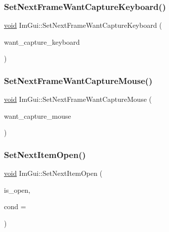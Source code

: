 \mbox{\label{namespaceImGui_ac1b2639c15a22180748c792aff2a7e60}} 
\subsubsection{\texorpdfstring{Set\+Next\+Frame\+Want\+Capture\+Keyboard()}{SetNextFrameWantCaptureKeyboard()}}
{\footnotesize\ttfamily \hyperlink{imgui__impl__opengl3__loader_8h_ac668e7cffd9e2e9cfee428b9b2f34fa7}{void} Im\+Gui\+::\+Set\+Next\+Frame\+Want\+Capture\+Keyboard (\begin{DoxyParamCaption}\item[{bool}]{want\+\_\+capture\+\_\+keyboard }\end{DoxyParamCaption})}

\mbox{\label{namespaceImGui_affc347668060a3dfbfae50247eaac7d2}} 
\subsubsection{\texorpdfstring{Set\+Next\+Frame\+Want\+Capture\+Mouse()}{SetNextFrameWantCaptureMouse()}}
{\footnotesize\ttfamily \hyperlink{imgui__impl__opengl3__loader_8h_ac668e7cffd9e2e9cfee428b9b2f34fa7}{void} Im\+Gui\+::\+Set\+Next\+Frame\+Want\+Capture\+Mouse (\begin{DoxyParamCaption}\item[{bool}]{want\+\_\+capture\+\_\+mouse }\end{DoxyParamCaption})}

\mbox{\label{namespaceImGui_a4a90137256a3ce852e726cb65d55b627}} 
\subsubsection{\texorpdfstring{Set\+Next\+Item\+Open()}{SetNextItemOpen()}}
{\footnotesize\ttfamily \hyperlink{imgui__impl__opengl3__loader_8h_ac668e7cffd9e2e9cfee428b9b2f34fa7}{void} Im\+Gui\+::\+Set\+Next\+Item\+Open (\begin{DoxyParamCaption}\item[{bool}]{is\+\_\+open,  }\item[{Im\+Gui\+Cond}]{cond = {} }\end{DoxyParamCaption})}


